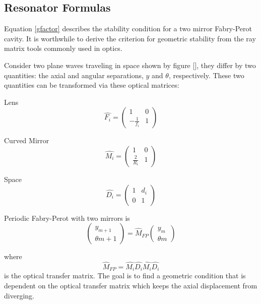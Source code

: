 \documentclass[oneside]{book}
\begin{document}
\begin{appendices}

	\chapter{Resonator Formulas} \label{FPappendix}
	Equation \ref{gfactor} describes the stability condition for a two mirror Fabry-Perot cavity.  It is worthwhile to derive the criterion for geometric stability from the ray matrix tools commonly used in optics. 
	
	Consider two plane waves traveling in space shown by figure [], they differ by two quantities: the axial and angular separations,  $y$ and $\theta$, respectively.  These two quantities can be transformed via these optical matrices:
	
	Lens
	\begin{equation} \label{lens}
	\hat{F_i} = 
	\begin{pmatrix}
		1				&0			
	\\ 	-\frac{1}{f_i}	&1
	\end{pmatrix}
	\end{equation}
	
	Curved Mirror
	\begin{equation} \label{mirror}
	\hat{M_i} = 
	\begin{pmatrix}
		1				&0			
	\\ 	\frac{2}{R_i}	&1
	\end{pmatrix}
	\end{equation}
	
	Space
	\begin{equation} \label{space}
	\hat{D_i} = 
	\begin{pmatrix}
		1	& d_i		
	\\ 	0	&1
	\end{pmatrix}
	\end{equation}
	
	
	Periodic Fabry-Perot with two mirrors is 
	\begin{equation}
	\begin{pmatrix} y_{m+1} 
	\\ \theta{m+1}
	\end{pmatrix}
	= \hat{M}_{FP} \begin{pmatrix} y_{m} 
	\\ \theta{m}
	\end{pmatrix}
	\end{equation}

	where 
	\begin{equation}
	\hat{M}_{FP} = \hat{M_i} \hat{D_i} \hat{M_i} \hat{D_i}
	\end{equation}
	is the optical transfer matrix.
	The goal is to find a geometric condition that is dependent on the optical transfer matrix which keeps the axial displacement from diverging.
	

\end{appendices}
\end{document}
